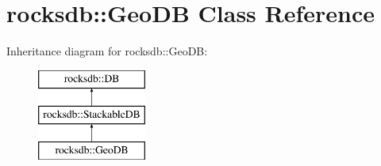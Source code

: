 \hypertarget{classrocksdb_1_1GeoDB}{}\section{rocksdb\+:\+:Geo\+DB Class Reference}
\label{classrocksdb_1_1GeoDB}
Inheritance diagram for rocksdb\+:\+:Geo\+DB\+:\begin{figure}[H]
\begin{center}
\leavevmode
\includegraphics[height=3.000000cm]{classrocksdb_1_1GeoDB}
\end{center}
\end{figure}
